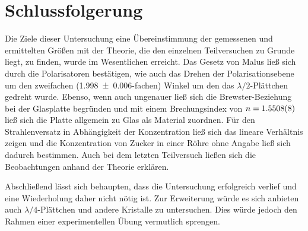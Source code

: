 \section{Schlussfolgerung}

	Die Ziele dieser Untersuchung eine Übereinstimmung der gemessenen und ermittelten Größen mit der Theorie, die den einzelnen Teilversuchen zu Grunde liegt, zu finden, wurde im Wesentlichen erreicht.
	Das Gesetz von Malus ließ sich durch die Polarisatoren bestätigen, wie auch das Drehen der Polarisationsebene um den zweifachen (\SI{1,998+-0,006}{}-fachen) Winkel um den das $\lambda/2$-Plättchen gedreht wurde.
	Ebenso, wenn auch ungenauer ließ sich die Brewster-Beziehung bei der Glasplatte begründen und mit einem Brechungsindex von $n = \SI{1,5508+-0,0008}{}$ ließ sich die Platte allgemein zu Glas als Material zuordnen.
	Für den Strahlenversatz in Abhängigkeit der Konzentration ließ sich das lineare Verhältnis zeigen und die Konzentration von Zucker in einer Röhre ohne Angabe ließ sich dadurch bestimmen.
	Auch bei dem letzten Teilversuch ließen sich die Beobachtungen anhand der Theorie erklären. 
	
	Abschließend lässt sich behaupten, dass die Untersuchung erfolgreich verlief und eine Wiederholung daher nicht nötig ist.
	Zur Erweiterung würde es sich anbieten auch $\lambda/4$-Plättchen und andere Kristalle zu untersuchen.
	Dies würde jedoch den Rahmen einer experimentellen Übung vermutlich sprengen.